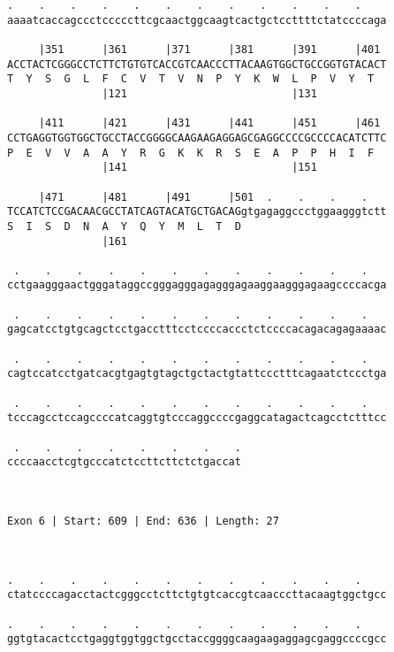 \documentclass{article}
\begin{document}
\begin{Verbatim}
.    .    .    .    .    .    .    .    .    .    .    .    
aaaatcaccagccctcccccttcgcaactggcaagtcactgctccttttctatccccaga
                                                            
     |351      |361      |371      |381      |391      |401 
ACCTACTCGGGCCTCTTCTGTGTCACCGTCAACCCTTACAAGTGGCTGCCGGTGTACACT
T  Y  S  G  L  F  C  V  T  V  N  P  Y  K  W  L  P  V  Y  T  
               |121                          |131           
  
     |411      |421      |431      |441      |451      |461 
CCTGAGGTGGTGGCTGCCTACCGGGGCAAGAAGAGGAGCGAGGCCCCGCCCCACATCTTC
P  E  V  V  A  A  Y  R  G  K  K  R  S  E  A  P  P  H  I  F  
               |141                          |151           
  
     |471      |481      |491      |501  .    .    .    .   
TCCATCTCCGACAACGCCTATCAGTACATGCTGACAGgtgagaggccctggaagggtctt
S  I  S  D  N  A  Y  Q  Y  M  L  T  D                       
               |161                                         
  
 .    .    .    .    .    .    .    .    .    .    .    .   
cctgaagggaactgggataggccgggagggagagggagaaggaagggagaagccccacga
                                                            
 .    .    .    .    .    .    .    .    .    .    .    .   
gagcatcctgtgcagctcctgacctttcctccccaccctctccccacagacagagaaaac
                                                            
 .    .    .    .    .    .    .    .    .    .    .    .   
cagtccatcctgatcacgtgagtgtagctgctactgtattccctttcagaatctccctga
                                                            
 .    .    .    .    .    .    .    .    .    .    .    .   
tcccagcctccagccccatcaggtgtcccaggccccgaggcatagactcagcctctttcc
                                                            
 .    .    .    .    .    .    .    .
ccccaacctcgtgcccatctccttcttctctgaccat
                                     
                                     
 
Exon 6 | Start: 609 | End: 636 | Length: 27



.    .    .    .    .    .    .    .    .    .    .    .    
ctatccccagacctactcgggcctcttctgtgtcaccgtcaacccttacaagtggctgcc
                                                            
.    .    .    .    .    .    .    .    .    .    .    .    
ggtgtacactcctgaggtggtggctgcctaccggggcaagaagaggagcgaggccccgcc
                                                            

\end{Verbatim}
\end{document}
